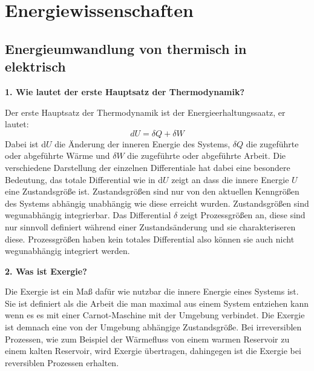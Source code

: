 \section{Energiewissenschaften}
\subsection{Energieumwandlung von thermisch in elektrisch}
\noindent\textbf{1. Wie lautet der erste Hauptsatz der Thermodynamik?}\\
\begin{addmargin}[25pt]{0pt}
Der erste Hauptsatz der Thermodynamik ist der Energieerhaltungssaatz, er lautet:
\begin{equation}\label{eq:Energieerhaltung}
    \si{d}U = \delta Q + \delta W
\end{equation}
Dabei ist d$U$ die Änderung der inneren Energie des Systems, $\delta Q$ die zugeführte oder abgeführte Wärme und $\delta W$ die zugeführte oder abgeführte Arbeit. Die verschiedene Darstellung der einzelnen Differentiale hat dabei eine besondere Bedeutung, das totale Differential wie in d$U$ zeigt an dass die innere Energie $U$ eine Zustandsgröße ist. Zustandsgrößen sind nur von den aktuellen Kenngrößen des Systems abhängig unabhängig wie diese erreicht wurden. Zustandsgrößen sind wegunabhängig integrierbar. Das Differential $\delta$ zeigt Prozessgrößen an, diese sind nur sinnvoll definiert während einer Zustandsänderung und sie charakteriseren diese. Prozessgrößen haben kein totales Differential also können sie auch nicht wegunabhängig integriert werden.\\    
\end{addmargin}

\noindent\textbf{2. Was ist Exergie?}\\
\begin{addmargin}[25pt]{0pt}
Die Exergie ist ein Maß dafür wie nutzbar die innere Energie eines Systems ist. Sie ist definiert als die Arbeit die man maximal aus einem System entziehen kann wenn es es mit einer Carnot-Maschine mit der Umgebung verbindet. Die Exergie ist demnach eine von der Umgebung abhängige Zustandsgröße. Bei irreversiblen Prozessen, wie zum Beispiel der Wärmefluss von einem warmen Reservoir zu einem kalten Reservoir, wird Exergie übertragen, dahingegen ist die Exergie bei reversiblen Prozessen erhalten.\\
\end{addmargin}

